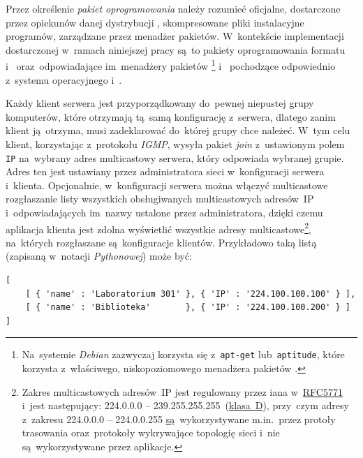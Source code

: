 \documentclass[thesis]{subfiles}
\begin{document}
Przez określenie \emph{pakiet oprogramowania} należy rozumieć oficjalne, dostarczone przez opiekunów danej dystrybucji , skompresowane pliki instalacyjne programów, zarządzane przez menadżer pakietów. W~kontekście implementacji dostarczonej w~ramach niniejszej pracy są~to pakiety oprogramowania formatu~ i~ oraz~odpowiadające im~menadżery pakietów \footnote{Na~systemie \emph{Debian} zazwyczaj korzysta się z~\texttt{apt-get} lub~\texttt{aptitude}, które korzysta z~właściwego, niskopoziomowego menadżera pakietów .} i~ pochodzące odpowiednio z~systemu operacyjnego  i~.

Każdy klient serwera jest przyporządkowany do~pewnej niepustej grupy komputerów, które otrzymają tą~samą konfigurację z~serwera, dlatego zanim klient ją~otrzyma, musi zadeklarować do~której grupy chce należeć. W~tym celu klient, korzystając z~protokołu \emph{IGMP}, wysyła pakiet \emph{join} z~ustawionym polem \texttt{IP} na~wybrany adres multicastowy serwera, który odpowiada wybranej grupie. Adres ten jest ustawiany przez administratora sieci w~konfiguracji serwera i~klienta. Opcjonalnie, w~konfiguracji serwera można włączyć multicastowe rozgłaszanie listy wszystkich obsługiwanych multicastowych adresów~IP i~odpowiadających im~nazwy ustalone przez administratora, dzięki czemu aplikacja klienta jest zdolna wyświetlić wszystkie adresy multicastowe\footnote{Zakres multicastowych adresów~IP jest regulowany przez \gls{iana} w~\href{https://tools.ietf.org/html/rfc5771}{RFC5771} i~jest następujący: 224.0.0.0 -- 239.255.255.255~(\href{https://en.wikipedia.org/wiki/Classful_network\#Classful_addressing_definition}{klasa~D}), przy~czym adresy z~zakresu 224.0.0.0 -- 224.0.0.255 \href{https://www.iana.org/assignments/multicast-addresses/multicast-addresses.xhtml}{są}~wykorzystywane m.in.~przez protoły trasowania oraz~protokoły wykrywające topologię sieci i~nie są~wykorzystywane przez aplikacje.}, na~których rozgłaszane są~konfiguracje klientów. Przykładowo taką listą (zapisaną w~notacji \emph{Pythonowej}) może być:
\begin{lstlisting}[numbers=none,frame=none]
[
	[ { 'name' : 'Laboratorium 301' }, { 'IP' : '224.100.100.100' } ],
	[ { 'name' : 'Biblioteka'       }, { 'IP' : '224.100.100.200' } ]
]
\end{lstlisting}
\end{document}
